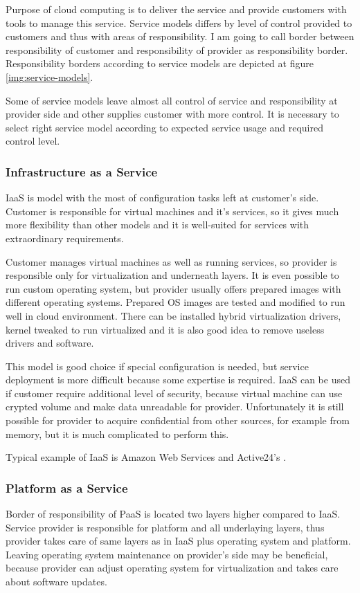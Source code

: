 
Purpose of cloud computing is to deliver the service and provide customers with tools to manage this service. Service models differs by level of control provided to customers and thus with areas of responsibility. I am going to call border between responsibility of customer and responsibility of provider as responsibility border. Responsibility borders according to service models are depicted at figure \ref{img:service-models}.

Some of service models leave almost all control of service and responsibility at provider side and other supplies customer with more control. It is necessary to select right service model according to expected service usage and required control level.

\subsubsection{Infrastructure as a Service}
\Ac{IaaS} is model with the most of configuration tasks left at customer's side. Customer is responsible for virtual machines and it's services, so it gives much more flexibility than other models and it is well-suited for services with extraordinary requirements. 

Customer manages virtual machines as well as running services, so provider is responsible only for virtualization and underneath layers. It is even possible to run custom operating system, but provider usually offers prepared images with different operating systems. Prepared \Ac{OS} images are tested and modified to run well in cloud environment. There can be installed hybrid virtualization drivers, kernel tweaked to run virtualized and it is also good idea to remove useless drivers and software. 

This model is good choice if special configuration is needed, but service deployment is more difficult because some expertise is required. \Ac{IaaS} can be used if customer require additional level of security, because virtual machine can use crypted volume and make data unreadable for provider. Unfortunately it is still possible for provider to acquire confidential from other sources, for example from memory, but it is much complicated to perform this.

Typical example of \Ac{IaaS} is Amazon Web Services and Active24's .

\subsubsection{Platform as a Service}
Border of responsibility of \Ac{PaaS} is located two layers higher compared to \Ac{IaaS}. Service provider is responsible for platform and all underlaying layers, thus provider takes care of same layers as in \Ac{IaaS} plus operating system and platform. 
Leaving operating system maintenance on provider's side may be beneficial, because provider can adjust operating system for virtualization and takes care about software updates. 

